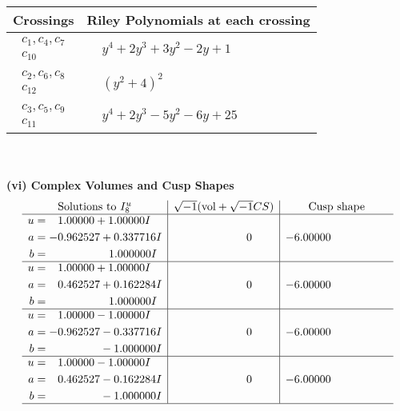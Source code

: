 \documentclass[1p]{elsarticle_modified}
\theoremstyle{definition}
\newcommand{\I}{\sqrt{-1}}
\begin{document}
\begin{tabular}{m{50pt}|m{274pt}}
Crossings & \hspace{64pt}Riley Polynomials at each crossing \\
\hline $$\begin{aligned}c_{1},c_{4},c_{7}\\c_{10}\end{aligned}$$&$\begin{aligned}
&y^4+2 y^3+3 y^2-2 y+1
\end{aligned}$\\
\hline $$\begin{aligned}c_{2},c_{6},c_{8}\\c_{12}\end{aligned}$$&$\begin{aligned}
&(y^2+4)^2
\end{aligned}$\\
\hline $$\begin{aligned}c_{3},c_{5},c_{9}\\c_{11}\end{aligned}$$&$\begin{aligned}
&y^4+2 y^3-5 y^2-6 y+25
\end{aligned}$\\
\hline
\end{tabular}\\~\\
\newpage\flushleft \textbf{(vi) Complex Volumes and Cusp Shapes}
$$\begin{array}{c|c|c}  
\text{Solutions to }I^u_{8}& \I (\text{vol} + \sqrt{-1}CS) & \text{Cusp shape}\\
 \hline 
\begin{aligned}
u &= \phantom{-}1.00000 + 1.00000 I \\
a &= -0.962527 + 0.337716 I \\
b &= \phantom{-0.000000 -}1.000000 I\end{aligned}
 & \phantom{-0.000000 } 0 & -6.00000\phantom{ +0.000000I} \\ \hline\begin{aligned}
u &= \phantom{-}1.00000 + 1.00000 I \\
a &= \phantom{-}0.462527 + 0.162284 I \\
b &= \phantom{-0.000000 -}1.000000 I\end{aligned}
 & \phantom{-0.000000 } 0 & -6.00000\phantom{ +0.000000I} \\ \hline\begin{aligned}
u &= \phantom{-}1.00000 - 1.00000 I \\
a &= -0.962527 - 0.337716 I \\
b &= \phantom{-0.000000 } -1.000000 I\end{aligned}
 & \phantom{-0.000000 } 0 & -6.00000\phantom{ +0.000000I} \\ \hline\begin{aligned}
u &= \phantom{-}1.00000 - 1.00000 I \\
a &= \phantom{-}0.462527 - 0.162284 I \\
b &= \phantom{-0.000000 } -1.000000 I\end{aligned}
 & \phantom{-0.000000 } 0 & -6.00000\phantom{ +0.000000I}\\
 \hline 
 \end{array}$$\newpage
\end{document}
